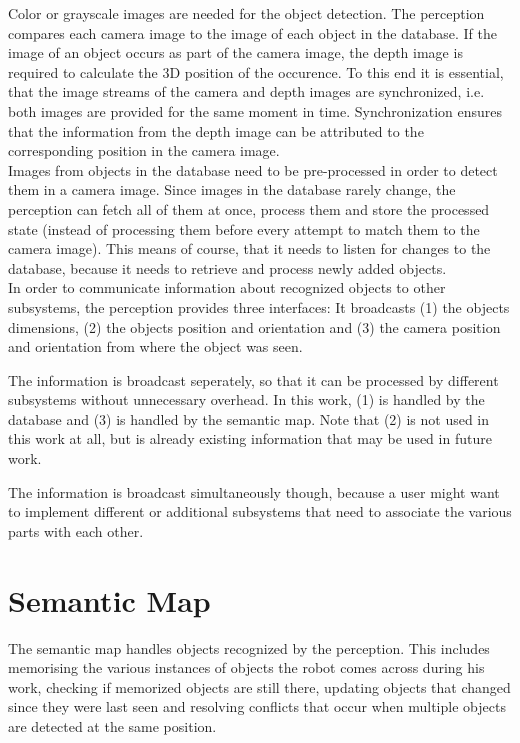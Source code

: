 Color or grayscale images are needed for the object detection. The perception compares each camera image to the image of each object in the database. If the image of an object occurs as part of the camera image, the depth image is required to calculate the 3D position of the occurence. To this end it is essential, that the image streams of the camera and depth images are synchronized, i.e. both images are provided for the same moment in time. Synchronization ensures that the information from the depth image can be attributed to the corresponding position in the camera image. \\

Images from objects in the database need to be pre-processed in order to detect them in a camera image. Since images in the database rarely change, the perception can fetch all of them at once, process them and store the processed state (instead of processing them before every attempt to match them to the camera image). This means of course, that it needs to listen for changes to the database, because it needs to retrieve and process newly added objects. \\

In order to communicate information about recognized objects to other subsystems, the perception provides three interfaces: It broadcasts (1) the objects dimensions, (2) the objects position and orientation and (3) the camera position and orientation from where the object was seen.

The information is broadcast seperately, so that it can be processed by different subsystems without unnecessary overhead. In this work, (1) is handled by the database and (3) is handled by the semantic map. Note that (2) is not used in this work at all, but is already existing information that may be used in future work.

The information is broadcast simultaneously though, because a user might want to implement different or additional subsystems that need to associate the various parts with each other.

\section{Semantic Map}
\label{sec:arch-map}
The semantic map handles objects recognized by the perception. This includes memorising the various instances of objects the robot comes across during his work, checking if memorized objects are still there, updating objects that changed since they were last seen and resolving conflicts that occur when multiple objects are detected at the same position. \\

